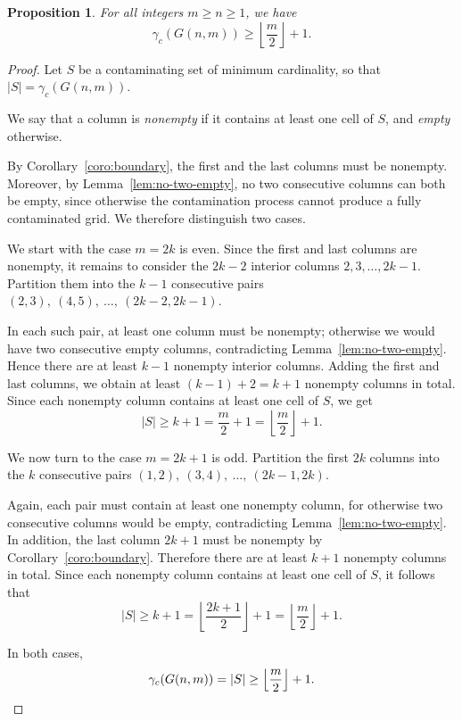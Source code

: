 \documentclass[letterpaper,12pt]{article}
\newtheorem{proposition}{Proposition}
\begin{document}
\begin{proposition}\label{proposition_lower_bound}
For all integers $m \ge n \ge 1$, we have
\begin{equation}
    \gamma_c(G(n,m)) \ge \left\lfloor \frac{m}{2} \right\rfloor + 1.
\end{equation}
\end{proposition}

\begin{proof}
Let $S$ be a contaminating set of minimum cardinality, so that $|S|=\gamma_c(G(n,m))$.

We say that a column is \emph{nonempty} if it contains at least one cell of $S$, and \emph{empty}
otherwise.

By Corollary~\ref{coro:boundary}, the first and the last columns must be nonempty. Moreover, by
Lemma~\ref{lem:no-two-empty}, no two consecutive columns can both
be empty, since otherwise the contamination process cannot produce a fully contaminated grid. We therefore distinguish two cases.


 
We start with the case $m=2k$ is even. 
Since the first and last columns are nonempty, it remains to consider the $2k-2$ interior columns
$2,3,\dots,2k-1$. Partition them into the $k-1$ consecutive pairs $(2,3),\ (4,5),\ \dots,\ (2k-2,2k-1)$.
 
In each such pair, at least one column must be nonempty; otherwise we would have two consecutive
empty columns, contradicting
Lemma~\ref{lem:no-two-empty}. Hence there are at least $k-1$
nonempty interior columns. Adding the first and last columns, we obtain at least $(k-1)+2 = k+1$ 
nonempty columns in total. Since each nonempty column contains at least one cell of $S$, we get
\[
|S| \ge k+1 = \frac{m}{2}+1 = \left\lfloor \frac{m}{2} \right\rfloor +1.
\]

We now turn to the case $m=2k+1$ is odd. 
Partition the first $2k$ columns into the $k$ consecutive pairs $(1,2),\ (3,4),\ \dots,\ (2k-1,2k)$.
 
Again, each pair must contain at least one nonempty column, for otherwise two consecutive columns
would be empty, contradicting
Lemma~\ref{lem:no-two-empty}. In addition, the last column
$2k+1$ must be nonempty by Corollary~\ref{coro:boundary}. Therefore there are at least $k+1$ nonempty columns in total. Since each nonempty column contains at least one cell of $S$, it follows
that
\[
|S| \ge k+1 = \left\lfloor \frac{2k+1}{2} \right\rfloor +1
= \left\lfloor \frac{m}{2} \right\rfloor +1.
\]

In both cases,
\[
\gamma_c(G(n,m)) = |S| \ge \left\lfloor \frac{m}{2} \right\rfloor +1.\qedhere
\]
\end{proof}
\end{document}
